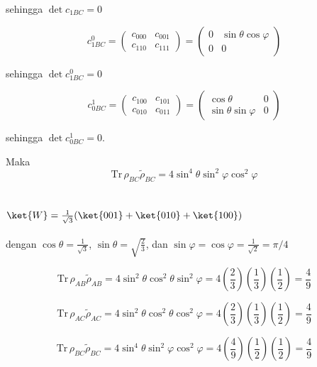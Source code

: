 sehingga $\det c_{1BC} = 0$

\begin{equation}
	c_{1BC}^0=
	\begin{pmatrix}
		c_{000} & c_{001} \\
		c_{110} & c_{111}
	\end{pmatrix}=
	\begin{pmatrix}
		0 & \sin\theta\cos\varphi \\
		0 & 0
	\end{pmatrix}
\end{equation}

sehingga $\det c_{1BC}^0 = 0$

\begin{equation}
	c_{0BC}^1=
	\begin{pmatrix}
		c_{100} & c_{101} \\
		c_{010} & c_{011}
	\end{pmatrix}=
	\begin{pmatrix}
		\cos\theta & 0 \\
		\sin\theta\sin\varphi & 0
	\end{pmatrix}
\end{equation}

sehingga $\det c_{0BC}^1 = 0$.

Maka
\begin{equation}
	\mathrm{Tr}\,\rho_{BC}\tilde{\rho}_{BC}=4\sin^4\theta \sin^2\varphi\cos^2\varphi
\end{equation}

\subsection{$\ket{W}=\frac{1}{\sqrt{3}}(\ket{001}+\ket{010}+\ket{100})$}
dengan $\cos\theta=\frac{1}{\sqrt{3}}$, $\sin\theta=\sqrt{\frac{2}{3}}$, dan $\sin\varphi=\cos\varphi=\frac{1}{\sqrt{2}}=\pi/4$

\begin{equation}
	\mathrm{Tr}\,\rho_{AB}\tilde{\rho}_{AB}=4\sin^2\theta \cos^2\theta \sin^2\varphi=4(\frac{2}{3})(\frac{1}{3})(\frac{1}{2})=\frac{4}{9}
\end{equation}

\begin{equation}
	\mathrm{Tr}\,\rho_{AC}\tilde{\rho}_{AC}=4\sin^2\theta \cos^2\theta \cos^2\varphi=4(\frac{2}{3})(\frac{1}{3})(\frac{1}{2})=\frac{4}{9}
\end{equation}

\begin{equation}
	\mathrm{Tr}\,\rho_{BC}\tilde{\rho}_{BC}=4\sin^4\theta \sin^2\varphi\cos^2\varphi=4(\frac{4}{9})(\frac{1}{2})(\frac{1}{2})=\frac{4}{9}
\end{equation}

